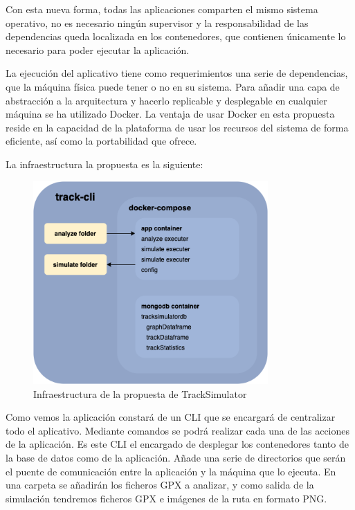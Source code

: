 Con esta nueva forma, todas las aplicaciones comparten el mismo sistema operativo, no es necesario ningún supervisor 
y la responsabilidad de las dependencias queda localizada en los contenedores, que contienen únicamente lo necesario 
para poder ejecutar la aplicación.

La ejecución del aplicativo tiene como requerimientos una serie de dependencias, que la máquina física puede tener o no 
en su sistema. Para añadir una capa de abstracción a la arquitectura y hacerlo replicable y desplegable en cualquier máquina
se ha utilizado Docker. La ventaja de usar Docker en esta propuesta reside en la capacidad de la plataforma de usar los 
recursos del sistema de forma eficiente, así como la portabilidad que ofrece.

La infraestructura la propuesta es la siguiente:
\begin{figure}[htb]
\begin{center}
\includegraphics[width=0.8\textwidth]{./Imagenes/DockerStructure.png}
\caption{Infraestructura de la propuesta de TrackSimulator}
\label{DockerComparision}
\end{center}
\end{figure}
\newpage

Como vemos la aplicación constará de un \ac{CLI} que se encargará de centralizar todo el aplicativo. 
Mediante comandos se podrá realizar cada una de las acciones de la aplicación. Es este \ac{CLI} el 
encargado de desplegar los contenedores tanto de la base de datos como de la aplicación. Añade 
una serie de directorios que serán el puente de comunicación entre la aplicación y la máquina que lo 
ejecuta. En una carpeta se añadirán los ficheros \ac{GPX} a analizar, y como salida de la simulación 
tendremos ficheros \ac{GPX} e imágenes de la ruta en formato PNG.


